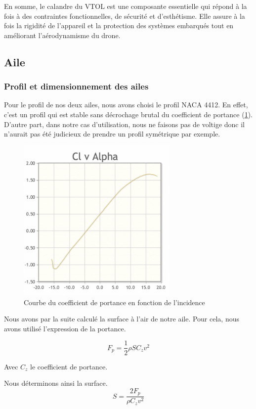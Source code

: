 \documentclass[a4paper,12pt,french]{report}
\begin{document}
En somme, le calandre du VTOL est une composante essentielle qui répond à la fois à des contraintes fonctionnelles, de sécurité et d'esthétisme. Elle assure à la fois la rigidité de l’appareil et la protection des systèmes embarqués tout en améliorant l'aérodynamisme du drone.


\subsection{Aile}

\subsubsection*{Profil et dimensionnement des ailes}

Pour le profil de nos deux ailes, nous avons choisi le profil NACA 4412. En effet, c'est un profil qui est stable sans décrochage brutal du coefficient de portance (\ref{cz}). D'autre part, dans notre cas d'utilisation, nous ne faisons pas de voltige donc il n'aurait pas été judicieux de prendre un profil symétrique par exemple.

\begin{figure}[h]
    \centering
    \includegraphics[height=8cm]{figures/cz.png}
    \caption{Courbe du coefficient de portance en fonction de l'incidence}
    \label{cz}
\end{figure}

Nous avons par la suite calculé la surface à l'air de notre aile. Pour cela, nous avons utilisé l'expression de la portance.

$$ F_p=\frac{1}{2}\rho S C_z v^2$$

Avec $C_z$ le coefficient de portance.

Nous déterminons ainsi la surface.
$$S=\frac{2F_p}{\rho C_z v^2}$$
\end{document}
